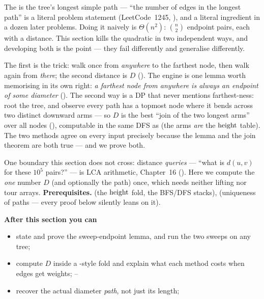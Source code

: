 \begin{topicintro}
The  is the tree's longest simple path --- ``the number of edges in the
longest path'' is a literal problem statement (LeetCode~1245, ), and a
literal ingredient in a dozen later problems. Doing it naively is
$\Theta(n^2)$: $\binom{n}{2}$ endpoint pairs, each with a distance. This section kills
the quadratic in two independent ways, and developing both is the point --- they fail
differently and generalise differently.

The first is the  trick: walk once from \emph{anywhere} to the farthest
node, then walk again from \emph{there}; the second distance is $D$
(). The engine is one lemma worth memorising in its own right:
\emph{a farthest node from anywhere is always an endpoint of some diameter}
(). The second way is a DP that never mentions farthest-ness: root
the tree, and observe every path has a topmost node where it bends across two distinct
downward arms --- so $D$ is the best ``join of the two longest arms'' over all nodes
(), computable in the same DFS as  (the arms
\emph{are} the $\operatorname{height}$ table). The two methods agree on every input precisely because
the lemma and the join theorem are both true --- and we prove both.

One boundary this section does not cross: distance \emph{queries} --- ``what is $d(u,v)$
for these $10^5$ pairs?'' --- is LCA arithmetic, Chapter~16 (). Here we compute
the \emph{one} number $D$ (and optionally the path) once, which needs neither lifting nor
tour arrays. \textbf{Prerequisites.}  (the $\operatorname{height}$ fold, the
BFS/DFS stacks),  (uniqueness of paths --- every proof below
silently leans on it).

\textbf{After this section you can}
\begin{itemize}[nosep]
  \item state and prove the sweep-endpoint lemma, and run the two sweeps on any tree; \hfill{}
  \item compute $D$ inside a -style fold and explain what each method
        costs when edges get weights; \hfill{}--
  \item recover the actual diameter \emph{path}, not just its length; \hfill{}
\end{itemize}
\end{topicintro}

